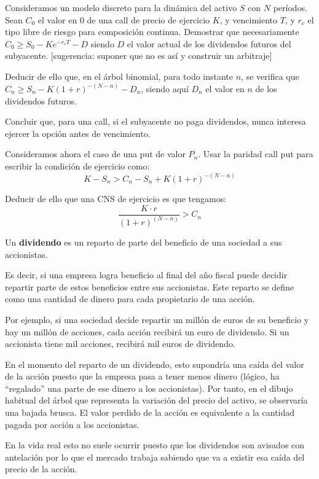 \begin{problem}[5]
Consideramos un modelo discreto para la dinámica del activo $S$ con $N$ períodos. Sean $C_0$ el valor en 0 de una call de precio de ejercicio $K$, y vencimiento $T$, y $r_c$ el tipo libre de riesgo para composición continua.
\ppart Demostrar que necesariamente $C_0\geq S_0-Ke^{-r_cT}-D$ siendo $D$ el valor actual de los dividendos futuros del subyacente. [sugerencia: suponer que no es así y construir un arbitraje]

\ppart Deducir de ello que, en el árbol binomial, para todo instante $n$, se verifica que $C_n\geq S_n-K(1+r)^{-(N-n)}-D_n$, siendo aquí $D_n$ el valor en $n$ de los dividendos futuros.

\ppart Concluir que, para una call, si el subyacente no paga dividendos, nunca interesa ejercer la opción antes de vencimiento.

\ppart Consideramos ahora el caso de una put de valor $P_n$. Usar la paridad call put para escribir la condición de ejercicio como:
\[K-S_n > C_n-S_n + K(1+r)^{-(N-n)}\]

\ppart Deducir de ello que una CNS de ejercicio es que tengamos:
\[\frac{K\cdot r}{(1+r)^{(N-n)}}> C_n\]
\solution

\begin{defn}[Dividendo]
Un \textbf{dividendo} es un reparto de parte del beneficio de una sociedad a sus accionistas.

Es decir, si una empresa logra beneficio al final del año fiscal puede decidir repartir parte de estos beneficios entre sus accionistas. Este reparto se define como una cantidad de dinero para cada propietario de una acción.

Por ejemplo, si una sociedad decide repartir un millón de euros de su beneficio y hay un millón de acciones, cada acción recibirá un euro de dividendo. Si un accionista tiene mil acciones, recibirá mil euros de dividendo.
\end{defn}

En el momento del reparto de un dividendo, esto supondría una caída del valor de la acción puesto que la empresa pasa a tener menos dinero (lógico, ha ``regalado'' una parte de ese dinero a los accionistas). Por tanto, en el dibujo habitual del árbol que representa la variación del precio del activo, se observaría una bajada brusca. El valor perdido de la acción es equivalente a la cantidad pagada por acción a los accionistas.

En la vida real esto no suele ocurrir puesto que los dividendos son avisados con antelación por lo que el mercado trabaja sabiendo que va a existir esa caída del precio de la acción.


\end{problem}
